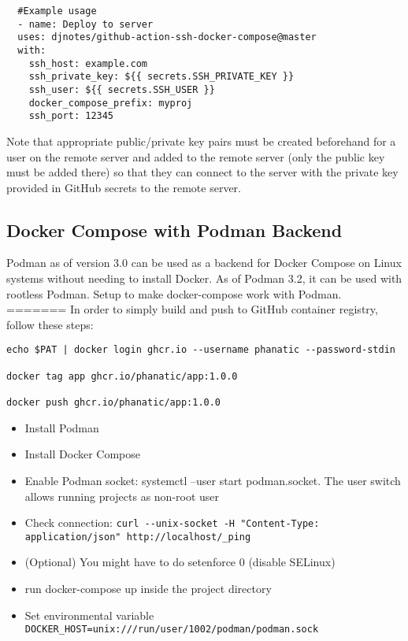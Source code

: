 \documentclass{article}
\begin{document}
\begin{lstlisting}
  #Example usage
  - name: Deploy to server
  uses: djnotes/github-action-ssh-docker-compose@master
  with:
    ssh_host: example.com
    ssh_private_key: ${{ secrets.SSH_PRIVATE_KEY }}
    ssh_user: ${{ secrets.SSH_USER }}
    docker_compose_prefix: myproj
    ssh_port: 12345

\end{lstlisting}
Note that appropriate public/private key pairs must be created beforehand for a user on the 
remote server and added to the remote server (only the public key must be added there) so that they can connect to the server with the private key provided in 
GitHub secrets to the remote server.

\subsection{Docker Compose with Podman Backend}
Podman as of version 3.0 can be used as a backend for Docker Compose on Linux systems without needing to install Docker. As of Podman 3.2, it can be used with rootless Podman. 
Setup to make docker-compose work with Podman. 
=======
In order to simply build and push to GitHub container registry, follow these steps:

\begin{verbatim}
echo $PAT | docker login ghcr.io --username phanatic --password-stdin

docker tag app ghcr.io/phanatic/app:1.0.0

docker push ghcr.io/phanatic/app:1.0.0

\end{verbatim}


\begin{itemize}
	\item Install Podman
	\item Install Docker Compose
	\item Enable Podman socket: systemctl --user start podman.socket. The user switch allows running projects as non-root user 
	\item Check connection: \lstinline{curl --unix-socket -H "Content-Type: application/json" http://localhost/_ping}
	\item (Optional) You might have to do setenforce 0 (disable SELinux)
	\item run docker-compose up inside the project directory
	\item Set environmental variable \lstinline{DOCKER_HOST=unix:///run/user/1002/podman/podman.sock}
	
\end{itemize}
\end{document}
